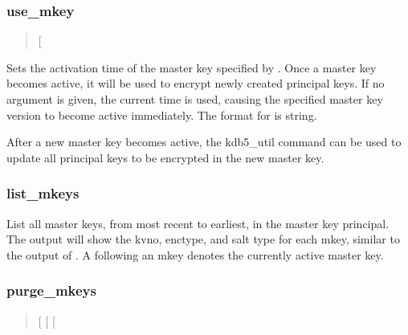 \documentclass[letterpaper,10pt,english]{sphinxmanual}
\begin{document}
\subsubsection{use\_mkey}
\label{\detokenize{admin/admin_commands/kdb5_util:use-mkey}}\begin{quote}

  {[}\sphinxstyleemphasis{time}{]}
\end{quote}

Sets the activation time of the master key specified by .
Once a master key becomes active, it will be used to encrypt newly
created principal keys.  If no  argument is given, the current
time is used, causing the specified master key version to become
active immediately.  The format for  is  string.

After a new master key becomes active, the kdb5\_util
 command can be used to update all
principal keys to be encrypted in the new master key.


\subsubsection{list\_mkeys}
\label{\detokenize{admin/admin_commands/kdb5_util:list-mkeys}}\begin{quote}

\end{quote}

List all master keys, from most recent to earliest, in the master key
principal.  The output will show the kvno, enctype, and salt type for
each mkey, similar to the output of {\hyperref[\detokenize{admin/admin_commands/kadmin_local:kadmin-1}]{}} .  A
\sphinxcode{*} following an mkey denotes the currently active master key.


\subsubsection{purge\_mkeys}
\label{\detokenize{admin/admin_commands/kdb5_util:purge-mkeys}}\begin{quote}

 {[}\sphinxstylestrong{-f}{]} {[}\sphinxstylestrong{-n}{]} {[}\sphinxstylestrong{-v}{]}
\end{quote}
\end{document}
